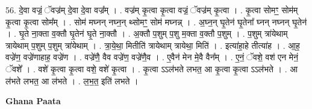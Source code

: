\documentclass[17pt]{extarticle}
\begin{document}
56. दे॒वा वज्रं॒ ॅवज्र॑म् दे॒वा दे॒वा वज्र᳚म् । . वज्र॑म् कृ॒त्वा कृ॒त्वा वज्रं॒ ॅवज्र॑म् कृ॒त्वा । . कृ॒त्वा सोमꣳ॒॒ सोम॑म् कृ॒त्वा कृ॒त्वा सोम᳚म् । . सोम॑ मघ्नन् नघ्न॒न् थ्सोमꣳ॒॒ सोम॑ मघ्नन्न् । . अ॒घ्न॒न् घृ॒तेन॑ घृ॒तेना᳚ घ्नन् नघ्नन् घृ॒तेन॑ । . घृ॒ते ना॒क्ता व॒क्तौ घृ॒तेन॑ घृ॒ते ना॒क्तौ । . अ॒क्तौ प॒शुम् प॒शु म॒क्ता व॒क्तौ प॒शुम् । . प॒शुम् त्रा॑येथाम् त्रायेथाम् प॒शुम् प॒शुम् त्रा॑येथाम् । . त्रा॒ये॒था॒ मितीति॑ त्रायेथाम् त्रायेथा॒ मिति॑ । . इत्या॑हा॒हे तीत्या॑ह । . आ॒ह॒ वज्रे॑ण॒ वज्रे॑णाहाह॒ वज्रे॑ण । . वज्रे॑णै॒ वैव वज्रे॑ण॒ वज्रे॑णै॒व । . ए॒वैन॑ मेन मे॒वै वैन᳚म् । . ए॒नं॒ ॅवशे॒ वश॑ एन मेनं॒ ॅवशे᳚ । . वशे॑ कृ॒त्वा कृ॒त्वा वशे॒ वशे॑ कृ॒त्वा । . कृ॒त्वा ऽऽल॑भते लभत॒ आ कृ॒त्वा कृ॒त्वा ऽऽल॑भते । . आ ल॑भते लभत॒ आ ल॑भते । . ल॒भ॒त॒ इति॑ लभते । \newline

\textbf{Ghana Paata } \newline
\end{document}
